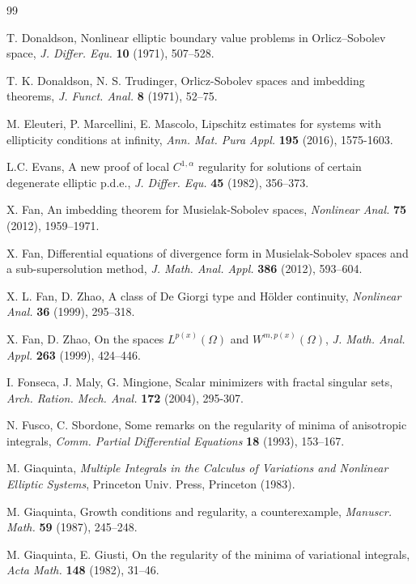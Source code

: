 \documentclass[10pt,reqno]{amsart}
\newcommand *\w{^\wedge}
\theoremstyle{definition}
\numberwithin{equation}{section}
\begin{document}
\begin{thebibliography}{99}
{ 
T. Donaldson, 
Nonlinear elliptic boundary value problems in Orlicz–Sobolev space, 
{\it J. Differ. Equ.} \textbf{10} (1971), 507–528.

T. K. Donaldson, N. S. Trudinger,
Orlicz-Sobolev spaces and imbedding theorems,
{\it J.  Funct. Anal.} \textbf{8} (1971), 52--75.

M. Eleuteri, P. Marcellini, E. Mascolo,
Lipschitz estimates for systems with ellipticity conditions at infinity,
{\it Ann. Mat. Pura Appl.} \textbf{195} (2016), 1575-1603.

L.C. Evans, 
A new proof of local $C^{1,\alpha}$ regularity for solutions of certain degenerate elliptic p.d.e., 
{\it J. Differ. Equ.} \textbf{45} (1982), 356–373.

X. Fan, 
An imbedding theorem for Musielak-Sobolev spaces, 
{\it Nonlinear Anal.} \textbf{75} (2012), 1959–1971.

X. Fan, 
Differential equations of divergence form in Musielak-Sobolev spaces and a sub-supersolution method, 
{\it J. Math. Anal. Appl.} \textbf{386} (2012), 593–604.

X. L. Fan, D. Zhao, 
A class of De Giorgi type and Hölder continuity, 
{\it Nonlinear Anal.} \textbf{36} (1999), 295–318.

X. Fan, D. Zhao,  
On the spaces $L^{p(x)}(\Omega)$ and $W^{m,p(x)}(\Omega)$,   
{\it J. Math. Anal. Appl.} \textbf{263} (1999), 424--446.

I. Fonseca, J. Maly, G. Mingione, 
Scalar minimizers with fractal singular sets, 
{\it Arch. Ration. Mech. Anal.} \textbf{172} (2004), 295-307.

N. Fusco, C. Sbordone, 
Some remarks on the regularity of minima of anisotropic integrals, 
{\it Comm. Partial Differential Equations} \textbf{18} (1993), 153–167.

M. Giaquinta, 
{\it Multiple Integrals in the Calculus of Variations and Nonlinear Elliptic Systems}, 
Princeton Univ. Press, Princeton (1983).

M. Giaquinta, 
Growth conditions and regularity, a counterexample, 
{\it Manuscr. Math.} \textbf{59} (1987), 245–248.

M. Giaquinta, E. Giusti, 
On the regularity of the minima of variational integrals, 
{\it Acta Math.} \textbf{148} (1982), 31–46.

}
\end{thebibliography}
\end{document}
